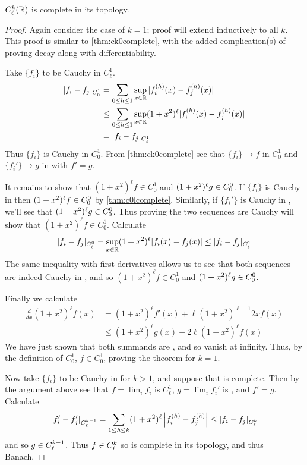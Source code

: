       \begin{thm}
        \label{thm:cklcomplete}
        ${C^k_\ell}(\mathbb{R})$ is complete in its topology.
      \end{thm}
      \begin{proof}
        Again consider the case of $k=1$; proof will extend inductively to all $k$.
        This proof is similar to \cref{thm:ck0complete}, with the added complication(s) of proving decay along with differentiability.

        Take $\{f_i\}$ to be Cauchy in $C^1_\ell$.
        \begin{align*}
          |f_i-f_j|_{C^1_0}
          &= \sum_{0\le h\le 1}\sup_{x\in\mathbb{R}}|f_i^{(h)}(x)-f_j^{(h)}(x)|
          \\&\le \sum_{0\le h\le 1}\sup_{x\in\mathbb{R}}(1+x^2)^\ell|f_i^{(h)}(x)-f_j^{(h)}(x)|
          \\&= |f_i -f_j|_{C^1_\ell}
        \end{align*}
        Thus $\{f_i\}$ is Cauchy in $C^1_0$.
        From \cref{thm:ck0complete} see that $\{f_i\}\rightarrow f$ in $C^1_0$ and $\{f_i'\}\rightarrow g$ in \Coo with $f'=g$.

        It remains to show that $(1+x^2)^\ell f\in C^1_0$ and $(1+x^2)^\ell g\in{C^0_0}$.
        If $\{f_i\}$ is Cauchy in \Cl then $(1+x^2)^\ell f\in{C^0_0}$ by \cref{thm:c0lcomplete}.
        Similarly, if $\{f_i'\}$ is Cauchy in \Cl, we'll see that $(1+x^2)^\ell g\in{C^0_0}$.
        Thus proving the two sequences are Cauchy will show that $(1+x^2)^\ell f\in C^1_0$.
        Calculate
        \begin{align*}
          |f_i-f_j|_{C^0_\ell}
          = \sup_{x\in\mathbb{R}}(1+x^2)^\ell|f_i(x)-f_j(x)|
          \le |f_i -f_j|_{C^1_\ell}
        \end{align*}
        The same inequality with first derivatives allows us to see that both sequences are indeed Cauchy in \Cl, and so $(1+x^2)^\ell f\in C^1_0$ and $(1+x^2)^\ell g\in{C^0_0}$.

        Finally we calculate
        \begin{align*}
          \frac{d}{dx}(1+x^2)^\ell f(x)
          &= (1+x^2)^\ell f'(x) + \ell(1+x^2)^{\ell-1}2xf(x)\\
          &\le (1+x^2)^\ell g(x) + 2\ell(1+x^2)^\ell f(x)
        \end{align*}
        We have just shown that both summands are \Coo, and so vanish at infinity.
        Thus, by the definition of $C^1_0$, $f\in C^1_0$, proving the theorem for $k=1$.

        Now take $\{f_i\}$ to be Cauchy in \Ckl for $k>1$, and suppose that \Ckml is complete.
        Then by the argument above see that $f=\lim_i f_i$ is $C^1_\ell$, $g=\lim_i f_i'$ is \Cl, and $f'=g$.
        Calculate
        \begin{align*}
          |f_i'-f_j'|_{C^{k-1}_\ell}
          = \sum_{1\le h\le k} (1+x^2)^\ell\left|f_i^{(h)}-f_j^{(h)}\right|
          \le |f_i-f_j|_{C^k_\ell}
        \end{align*}
        and so $g\in{C^{k-1}_\ell}$.
        Thus $f\in{C^k_\ell}$ so \Ckl is complete in its topology, and thus Banach.
      \end{proof}

